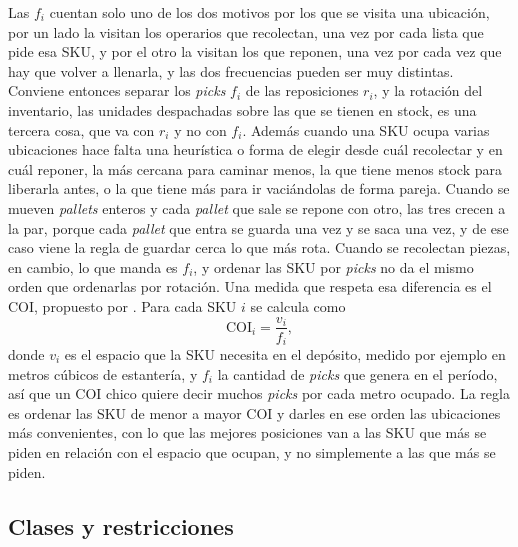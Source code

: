 Las $f_i$ cuentan solo uno de los dos motivos por los que se visita una ubicación, por un lado la visitan los operarios que recolectan, una vez por cada lista que pide esa SKU, y por el otro la visitan los que reponen, una vez por cada vez que hay que volver a llenarla, y las dos frecuencias pueden ser muy distintas.
Conviene entonces separar los \emph{picks} $f_i$ de las reposiciones $r_i$, y la rotación del inventario, las unidades despachadas sobre las que se tienen en stock, es una tercera cosa, que va con $r_i$ y no con $f_i$.
Además cuando una SKU ocupa varias ubicaciones hace falta una heurística o forma de elegir desde cuál recolectar y en cuál reponer, la más cercana para caminar menos, la que tiene menos stock para liberarla antes, o la que tiene más para ir vaciándolas de forma pareja.
Cuando se mueven \emph{pallets} enteros y cada \emph{pallet} que sale se repone con otro, las tres crecen a la par, porque cada \emph{pallet} que entra se guarda una vez y se saca una vez, y de ese caso viene la regla de guardar cerca lo que más rota.
Cuando se recolectan piezas, en cambio, lo que manda es $f_i$, y ordenar las SKU por \emph{picks} no da el mismo orden que ordenarlas por rotación.
Una medida que respeta esa diferencia es el \gls{COI}, propuesto por \citet{heskett1963cube}.
Para cada SKU $i$ se calcula como
\begin{equation}
    \mathrm{COI}_i = \frac{v_i}{f_i},
    \label{eq:coi}
\end{equation}
donde $v_i$ es el espacio que la SKU necesita en el depósito, medido por ejemplo en metros cúbicos de estantería, y $f_i$ la cantidad de \emph{picks} que genera en el período, así que un COI chico quiere decir muchos \emph{picks} por cada metro ocupado.
La regla es ordenar las SKU de menor a mayor COI y darles en ese orden las ubicaciones más convenientes, con lo que las mejores posiciones van a las SKU que más se piden en relación con el espacio que ocupan, y no simplemente a las que más se piden.

\subsection{Clases y restricciones}

